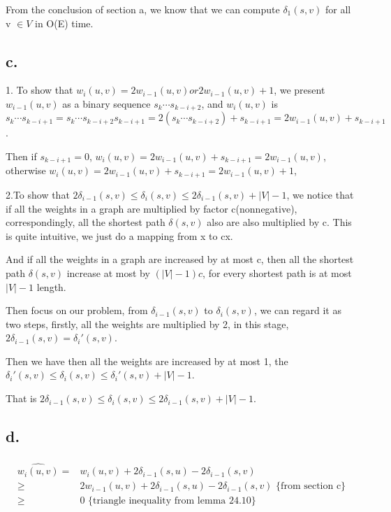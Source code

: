 \documentclass[oneside]{homework} %
\begin{document}
From the conclusion of section a, we know that we can compute $\delta_{1}(s,v)$ for all v $\in V$ in O(E) time.

\subsection*{c.}
1. To show that $w_{i}(u,v) = 2w_{i-1}(u,v) or 2w_{i-1}(u,v)+1$, we present $w_{i-1}(u,v)$ as a binary sequence $s_{k}\cdots s_{k-i+2}$, and $w_{i}(u,v)$ is $s_{k}\cdots s_{k-i+1} = s_{k}\cdots s_{k-i+2}s_{k-i+1} = 2(s_{k}\cdots s_{k-i+2}) + s_{k-i+1} = 2w_{i-1}(u,v)+s_{k-i+1}$. 

Then if $s_{k-i+1} = 0$, $w_{i}(u,v) = 2w_{i-1}(u,v) + s_{k-i+1} = 2w_{i-1}(u,v)$, otherwise $w_{i}(u,v) = 2w_{i-1}(u,v) + s_{k-i+1} = 2w_{i-1}(u,v)+1$,

2.To show that $2\delta_{i-1}(s,v) \leq \delta_{i}(s,v) \leq 2\delta_{i-1}(s,v)+|V|-1$, we notice that if all the weights in a graph are multiplied by factor c(nonnegative), correspondingly, all the shortest path $\delta(s,v)$ also are also multiplied by c. This is quite intuitive, we just do a mapping from x to cx. 

And if all the weights in a graph are increased by at most c, then all the shortest path $\delta(s,v)$ increase at most by $(|V|-1)c$, for every shortest path is at most $|V|-1$ length.

Then focus on our problem, from $\delta_{i-1}(s,v)$ to $\delta_{i}(s,v)$, we can regard it as two steps, firstly, all the weights are multiplied by 2, in this stage,$2\delta_{i-1}(s,v) = \delta_{i}'(s,v)$. 

Then we have then all the weights are increased by at most 1, the $\delta_{i}'(s,v) \leq \delta_{i}(s,v) \leq \delta_{i}'(s,v)+|V|-1$.

That is $2\delta_{i-1}(s,v) \leq \delta_{i}(s,v) \leq 2\delta_{i-1}(s,v)+|V|-1$.
\subsection*{d.}
\begin{eqnarray*}
  \begin{split}
	\hat{w_{i}(u,v)} =& w_{i}(u,v) + 2\delta_{i-1}(s,u) - 2\delta_{i-1}(s,v) \\
	\geq & 2w_{i-1}(u,v) + 2\delta_{i-1}(s,u) - 2\delta_{i-1}(s,v) \text{   \{from section c\}} \\
	\geq& 0 \text{   \{triangle inequality from lemma 24.10\}} \\
  \end{split}
  \label{equ:c1}
\end{eqnarray*}
\end{document}
